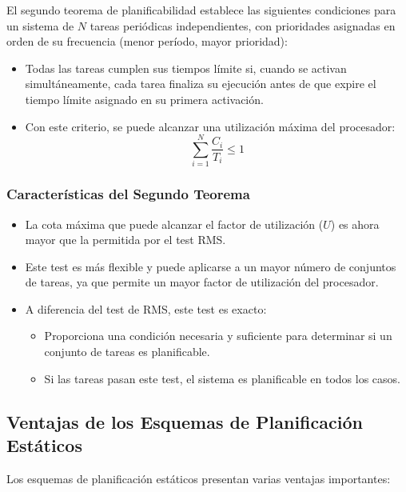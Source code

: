 \documentclass[a4paper,12pt]{article}
\begin{document}
El segundo teorema de planificabilidad establece las siguientes condiciones para un sistema de \(N\) tareas periódicas independientes, con prioridades asignadas en orden de su frecuencia (menor período, mayor prioridad):

\begin{itemize}
    \item Todas las tareas cumplen sus tiempos límite si, cuando se activan simultáneamente, cada tarea finaliza su ejecución antes de que expire el tiempo límite asignado en su primera activación.
    \item Con este criterio, se puede alcanzar una utilización máxima del procesador:
    \[
    \sum_{i=1}^N \frac{C_i}{T_i} \leq 1
    \]
\end{itemize}

\subsubsection{Características del Segundo Teorema}

\begin{itemize}
    \item La cota máxima que puede alcanzar el factor de utilización (\(U\)) es ahora mayor que la permitida por el test RMS.
    \item Este test es más flexible y puede aplicarse a un mayor número de conjuntos de tareas, ya que permite un mayor factor de utilización del procesador.
    \item A diferencia del test de RMS, este test es exacto:
    \begin{itemize}
        \item Proporciona una condición necesaria y suficiente para determinar si un conjunto de tareas es planificable.
        \item Si las tareas pasan este test, el sistema es planificable en todos los casos.
    \end{itemize}
\end{itemize}

\subsection{Ventajas de los Esquemas de Planificación Estáticos}

Los esquemas de planificación estáticos presentan varias ventajas importantes:
\end{document}

